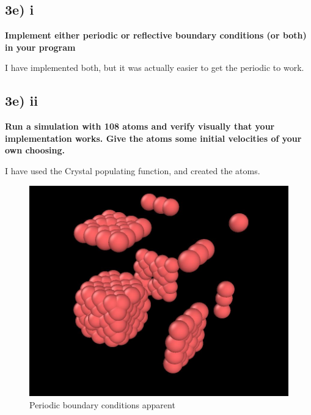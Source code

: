 \newpage
\subsection*{3e) i}
\textbf{Implement either periodic or reflective boundary conditions (or both) in your program}

I have implemented both, but it was actually easier to get the periodic to work. 



\subsection*{3e) ii}
 \textbf{Run a simulation with 108 atoms and verify visually that your implementation works. Give the
atoms some initial velocities of your own choosing.}

I have used the Crystal populating function, and created the atoms.


\begin{figure}[h!]
        \centering 
        \includegraphics[scale=0.6]{./py/3di_3_ovito.jpg} 
        \caption{Periodic boundary conditions apparent}
        \label{fig:3di_2}
\end{figure}



